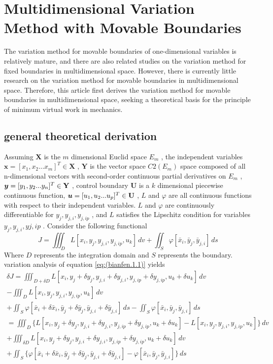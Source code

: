 \section {Multidimensional Variation Method with Movable Boundaries} \label{sec: bianfen}
The variation method for movable boundaries of one-dimensional variables is relatively mature, and there are also related studies on the variation method for fixed boundaries in multidimensional space. However, there is currently little research on the variation method for movable boundaries in multidimensional space. Therefore, this article first derives the variation method for movable boundaries in multidimensional space, seeking a theoretical basis for the principle of minimum virtual work in mechanics.

\subsection {general theoretical derivation}
Assuming $ \bm {X}$  is the $ m $ dimensional Euclid space $ E_m $ , the independent variables $ \bm {x}=[x_1, x_2... x_m] ^ T \in \bm {X}$  , $ \bm {Y}$  is the vector space $ C2 (E_m) $ space 
 composed of all n-dimensional vectors with second-order continuous partial derivatives on $ E_m $ , $ \bm {y}=[y_1, y_2... y_n] ^ T \in \bf {Y}$  , control boundary $ \bm {U}$  is a $ k $  dimensional piecewise continuous function, $ \bm {u}=[u_1, u_2... u_p] ^ T \in \bf {U}$  , $ L$  and $ \varphi$  are all continuous functions with respect to their independent variables. $ L$  and $ \varphi$  are continuously differentiable for $ y_j, y_{j, i}, y_{j, ip}$  , and $ L$  satisfies the Lipschitz condition for variables $ y_j, y_{j, i}, y {j,  ip}$  . Consider the following functional
\begin{equation}\label{eq:(bianfen.1.1)}
J = \iiint_D L[x_i,y_j,y_{j,i},y_{j,ip},u_k] \,dv + \iint_S \varphi[\bar {x}_i ,\bar {y}_j ,\bar {y}_ {j,i}] \,ds
\end{equation}
Where $ D $ represents the integration domain and $ S $ represents the boundary.
variation analysis of equation \ref{eq:(bianfen.1.1)} yields
\begin{multline} \label{eq:(bianfen.1.2)}    
\delta J = \iiint_{D+\delta D} L[x_i,y_j+\delta y_j,y_{j,i}+\delta y_{j,i},y_{j,ip}+\delta y_{j, ip},u_k+\delta u_k] \,dv 
\\-\iiint_D L[x_i,y_j,y_{j,i},y_{j,ip},u_k] \,dv 
\\+ \iint_S \varphi[\bar {x}_i +\delta \bar {x}_i ,\bar {y}_j +\delta \bar {y}_j ,\bar {y}_ {j,i}+\delta \bar {y}_ {j,i}] \,ds
- \iint_S \varphi[\bar {x}_i ,\bar {y}_j ,\bar {y}_ {j,i}] \,ds
\\= \iiint_D \{L[x_i,y_j+\delta y_j,y_{j,i}+\delta y_{j,i},y_{j,ip}+\delta y_{j,ip},u_k+\delta u_k]-L[x_i,y_j,y_{j,i},y_{j,ip},u_k] \}\,dv 
\\+\iiint_{\delta D} L[x_i,y_j+\delta y_j,y_{j,i}+\delta y_{j,i},y_{j,ip}+\delta y_{j, ip},u_k+\delta u_k] \,dv 
\\+\iint_S \{\varphi[\bar {x}_i +\delta \bar {x}_i ,\bar {y}_j +\delta \bar {y}_j ,\bar {y}_ {j,i}+\delta \bar {y}_ {j,i}] -\varphi[\bar {x}_i ,\bar {y}_j ,\bar {y}_ {j,i}]\} \,ds
\end{multline} 
